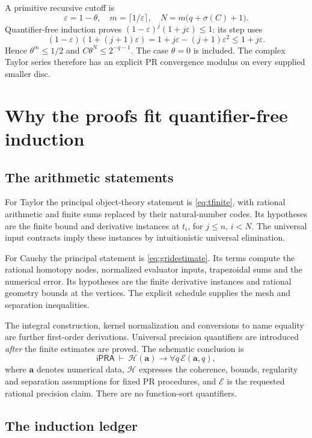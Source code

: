 \documentclass[11pt]{article}
\theoremstyle{definition}
\newcommand{\ipra}{\mathsf{iPRA}}
\begin{document}
A primitive recursive cutoff is
\[
 \varepsilon=1-\theta,\quad
 m=\lceil1/\varepsilon\rceil,\quad
 N=m\bigl(q+\sigma(C)+1\bigr).
\]
Quantifier-free induction proves
\((1-\varepsilon)^j(1+j\varepsilon)\le1\): its step uses
\[
 (1-\varepsilon)(1+(j+1)\varepsilon)
       =1+j\varepsilon-(j+1)\varepsilon^2\le1+j\varepsilon.
\]
Hence \(\theta^m\le1/2\) and \(C\theta^N\le2^{-q-1}\).
The case \(\theta=0\) is included. The complex Taylor series therefore has
an explicit PR convergence modulus on every supplied smaller disc.

\section{Why the proofs fit quantifier-free induction}\label{sec:ipra}

\subsection{The arithmetic statements}

For Taylor the principal object-theory statement is \eqref{eq:tfinite},
with rational arithmetic and finite sums replaced by their natural-number
codes. Its hypotheses are the finite bound and derivative instances at
\(t_i\), for \(j\le n\), \(i<N\). The universal input contracts imply
these instances by intuitionistic universal elimination.

For Cauchy the principal statement is \eqref{eq:gridestimate}. Its terms
compute the rational homotopy nodes, normalized evaluator inputs,
trapezoidal sums and the numerical error. Its hypotheses are the finite
derivative instances and rational geometry bounds at the vertices.
The explicit schedule supplies the mesh and separation inequalities.

The integral construction, kernel normalization and conversions to name
equality are further first-order derivations. Universal precision
quantifiers are introduced \emph{after} the finite estimates are proved.
The schematic conclusion is
\[
 \ipra\ \vdash\
   \mathcal H(\mathbf a)\longrightarrow
                    \forall q\,\mathcal E(\mathbf a,q),
\]
where \(\mathbf a\) denotes numerical data, \(\mathcal H\) expresses the
coherence, bounds, regularity and separation assumptions for fixed PR
procedures, and \(\mathcal E\) is the requested rational precision claim.
There are no function-sort quantifiers.

\subsection{The induction ledger}
\end{document}
